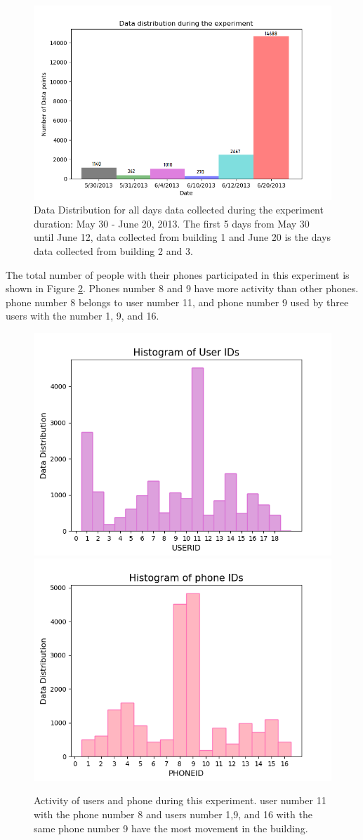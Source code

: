 \begin{figure}
    \centering
    \includegraphics[width = 12 cm]{image/Chapters/Chapter6/timedist.png}
    \caption{Data Distribution for all days data collected during the experiment duration: May 30 - June 20, 2013. The first 5  days from May 30 until June 12, data collected from building 1 and June 20 is the days data collected from building 2 and 3.}
    \label{timeline}
\end{figure}





The total number of people with their phones participated in this experiment is shown in Figure \ref{userphone}. Phones number 8 and 9 have more activity than other phones. phone number 8 belongs to user number 11, and phone number 9 used by three users with the number 1, 9, and 16.

\begin{figure}[!h]
    \centering
    \includegraphics[width=.5\textwidth]{image/Chapters/Chapter6/userID_data.png}\hfill
    \includegraphics[width=.5\textwidth]{image/Chapters/Chapter6/phoneID_data.png}
    \\[\smallskipamount]    
    \caption{Activity of users and phone during this experiment. user number 11 with the phone number 8 and users number 1,9, and 16 with the same phone number 9 have the most movement in the building.}
    \label{userphone}
\end{figure}


